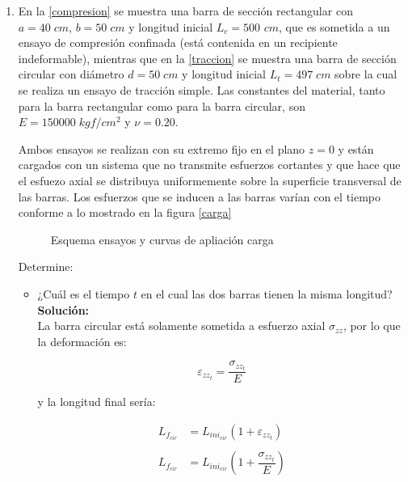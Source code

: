 \documentclass[../notas medios.tex]{subfiles}
\begin{document}
\begin{enumerate}
\item En la \cref{compresion} se muestra una barra de sección rectangular con $a= 40 \;cm$, $b = 50 \;cm$ y longitud inicial $L_{c} = 500$ $cm$, que es  sometida a un ensayo de compresión confinada (está contenida en un recipiente indeformable), mientras que en la \cref{traccion}  se muestra una barra de sección circular con diámetro $d = 50 \;cm$ y longitud inicial $L_{t} =497 \;cm$ sobre la cual se realiza  un ensayo de tracción simple. Las constantes del material, tanto para la barra rectangular como para la barra circular, son $E=150000 \; kgf/cm^2$ y $\nu=0.20$.

Ambos ensayos se realizan con su extremo fijo  en el plano $z = 0$ y están cargados con un sistema que no transmite esfuerzos cortantes y que hace que el esfuezo axial se distribuya uniformemente sobre la superficie transversal de las barras. Los esfuerzos que se inducen a las barras varían con el tiempo conforme a lo mostrado en la figura \cref{carga}
%
\begin{figure}[H]
	\centering
	\hspace{1 cm}
	\hspace{1 cm}
	\caption{Esquema ensayos y curvas de apliación carga}
	\label{ensayo}
\end{figure}

Determine: 
\begin{itemize}
	\item ¿Cuál es el tiempo $t$ en el cual las dos barras tienen la misma longitud? \\
	
	\textbf{Solución:}\\
	
	La barra circular está solamente sometida a esfuerzo axial $\sigma_{zz}$, por lo que la deformación es: 
	
	\[\varepsilon _{zz_t} = \dfrac{\sigma_{zz_t} }{E}\] 
	
	y la longitud final sería: 
	
	\begin{equation}
	\begin{split}
	{L_{f_{cir}}} & = L_{ini_{cir}} (1+  \varepsilon _{zz_t} ) \\\\
	{L_{f_{cir}}} & = L_{ini_{cir}} \left(1+  \dfrac{\sigma_{zz_t} }{E}\right) \\
	\end{split}
	\label{trac}
	\end{equation}
	

\end{itemize}
\end{enumerate}
\end{document}
